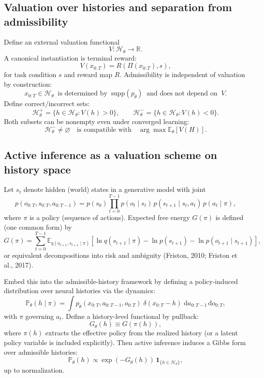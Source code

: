 \documentclass[11pt]{article}
\newcommand{\histories}{\mathcal{H}}
\newcommand{\valuation}{V}
\begin{document}
\subsection{Valuation over histories and separation from admissibility}

Define an external valuation functional
\[
\valuation:\histories_\theta\to\mathbb{R}.
\]
A canonical instantiation is terminal reward:
\[
\valuation(x_{0:T})=R(\Pi(x_{0:T}),s),
\]
for task condition $s$ and reward map $R$. Admissibility is independent of valuation by construction:
\[
x_{0:T}\in\histories_\theta \;\;\text{is determined by}\;\; \mathrm{supp}(p_\theta)\;\;\text{and does not depend on}\;\; \valuation.
\]
Define correct/incorrect sets:
\[
\histories_\theta^{+}=\{h\in\histories_\theta:\valuation(h)>0\},\qquad
\histories_\theta^{-}=\{h\in\histories_\theta:\valuation(h)<0\}.
\]
Both subsets can be nonempty even under converged learning:
\[
\histories_\theta^{-}\neq\varnothing\quad\text{is compatible with}\quad \arg\max \mathbb{E}_\theta[\valuation(H)].
\]

\subsection{Active inference as a valuation scheme on history space}

Let $s_t$ denote hidden (world) states in a generative model with joint
\[
p(o_{0:T},s_{0:T},a_{0:T-1}) = p(s_0)\prod_{t=0}^{T-1} p(o_t\mid s_t)\, p(s_{t+1}\mid s_t,a_t)\, p(a_t\mid \pi),
\]
where $\pi$ is a policy (sequence of actions). Expected free energy $G(\pi)$ is defined (one common form) by
\[
G(\pi)=\sum_{t=0}^{T-1}\mathbb{E}_{q(o_{t+1},s_{t+1}\mid \pi)}\!\left[
\ln q(s_{t+1}\mid \pi) - \ln p(s_{t+1}) - \ln p(o_{t+1}\mid s_{t+1})
\right],
\]
or equivalent decompositions into risk and ambiguity (Friston, 2010; Friston et al., 2017).

Embed this into the admissible-history framework by defining a policy-induced distribution over neural histories via the dynamics:
\[
\mathbb{P}_\theta(h\mid \pi)=\int p_\theta(x_{0:T},a_{0:T-1},o_{0:T})\;\delta(x_{0:T}-h)\; \mathrm{d}a_{0:T-1}\,\mathrm{d}o_{0:T},
\]
with $\pi$ governing $a_t$. Define a history-level functional by pullback:
\[
G_\theta(h) \equiv G(\pi(h)),
\]
where $\pi(h)$ extracts the effective policy from the realized history (or a latent policy variable is included explicitly). Then active inference induces a Gibbs form over admissible histories:
\[
\mathbb{P}_\theta(h) \propto \exp\!\left(-G_\theta(h)\right)\,\mathbf{1}_{\{h\in\histories_\theta\}},
\]
up to normalization.
\end{document}
